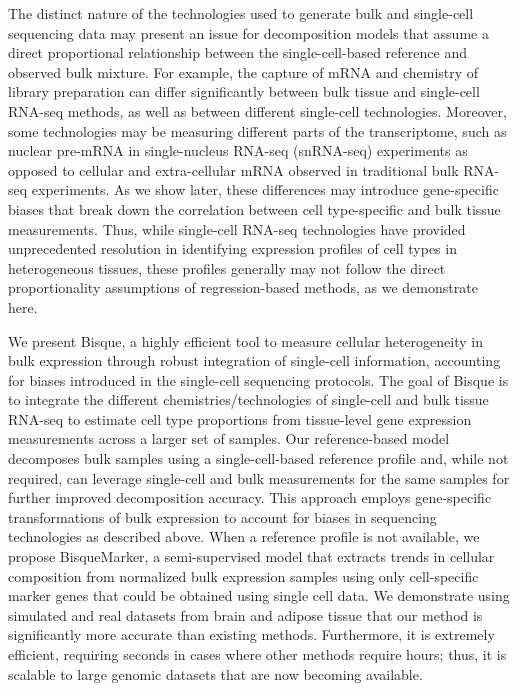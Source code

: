 The distinct nature of the technologies used to generate bulk and single-cell sequencing data may present an issue for decomposition models that assume a direct proportional relationship between the single-cell-based reference and observed bulk mixture. For example, the capture of mRNA and chemistry of library preparation can differ significantly between bulk tissue and single-cell RNA-seq methods, as well as between different single-cell technologies\cite{Ziegenhain2017-ss,La_Manno2018-tx}. Moreover, some technologies may be measuring different parts of the transcriptome, such as nuclear pre-mRNA in single-nucleus RNA-seq (snRNA-seq) experiments as opposed to cellular and extra-cellular mRNA observed in traditional bulk RNA-seq experiments. As we show later, these differences may introduce gene-specific biases that break down the correlation between cell type-specific and bulk tissue measurements. Thus, while single-cell RNA-seq technologies have provided unprecedented resolution in identifying expression profiles of cell types in heterogeneous tissues, these profiles generally may not follow the direct proportionality assumptions of regression-based methods, as we demonstrate here.

We present Bisque, a highly efficient tool to measure cellular heterogeneity in bulk expression through robust integration of single-cell information, accounting for biases introduced in the single-cell sequencing protocols. The goal of Bisque is to integrate the different chemistries/technologies of single-cell and bulk tissue RNA-seq to estimate cell type proportions from tissue-level gene expression measurements across a larger set of samples. Our reference-based model decomposes bulk samples using a single-cell-based reference profile and, while not required, can leverage single-cell and bulk measurements for the same samples for further improved decomposition accuracy. This approach employs gene-specific transformations of bulk expression to account for biases  in sequencing technologies as described above. When a reference profile is not available, we propose BisqueMarker, a semi-supervised model that extracts trends in cellular composition from normalized bulk expression samples using only cell-specific marker genes that could be obtained using single cell data. We demonstrate using simulated and real datasets from brain and adipose tissue that our method is significantly more accurate than existing methods. Furthermore, it is extremely efficient, requiring seconds in cases where other methods require hours; thus, it is scalable to large genomic datasets that are now becoming available.

